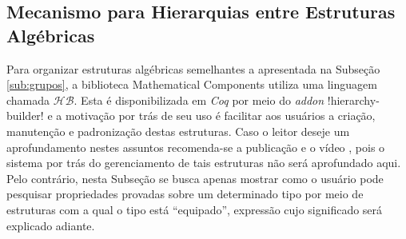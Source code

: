 \subsection{Mecanismo para Hierarquias entre Estruturas Algébricas}

Para organizar estruturas algébricas semelhantes a apresentada na Subseção \ref{sub:grupos}, a biblioteca Mathematical Components utiliza uma linguagem chamada $\mathcal{HB}$. Esta é disponibilizada em \textit{Coq} por meio do \textit{addon} \coqinline!hierarchy-builder! e a motivação por trás de seu uso é facilitar aos usuários a criação, manutenção e padronização destas estruturas. Caso o leitor deseje um aprofundamento nestes assuntos recomenda-se a publicação \cite{cohen:hal-02478907} e o vídeo \cite{youtuCohen}, pois o sistema por trás do gerenciamento de tais estruturas não será aprofundado aqui. Pelo contrário, nesta Subseção se busca apenas mostrar como o usuário pode pesquisar propriedades provadas sobre um determinado tipo por meio de estruturas com a qual o tipo está ``equipado'', expressão cujo significado será explicado adiante.


